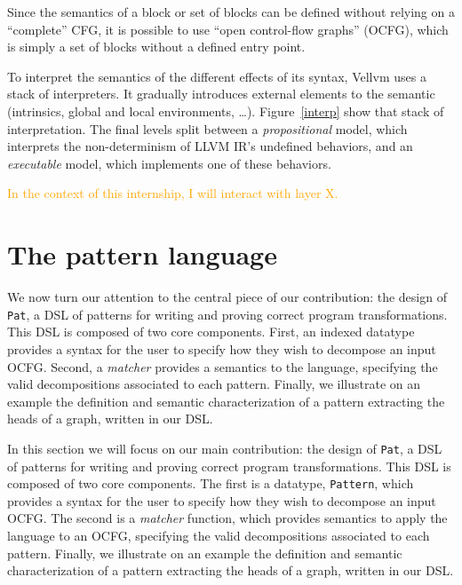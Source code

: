 \documentclass[11pt]{article}
\newcommand{\inlinecoq}[1]{\mbox{\lstinline[style=customcoq,columns=fixed,basewidth=.48em]{#1}}}
\newcommand{\ilc}[1]{\inlinecoq{#1}}
\newcommand{\gr}[1]{\textcolor{Orange}{#1}}
\newcommand{\yz}[1]{\textcolor{ForestGreen}{#1}}
\newcommand{\yzt}[1]{\textcolor{ForestGreen!50}{#1}}
\newcommand{\ocfg}{OCFG\xspace}
\newcommand{\pat}{\texttt{Pat}\xspace}
\begin{document}
Since the semantics of a block or set of blocks can be defined without relying on a ``complete'' CFG, it is possible to use ``open control-flow graphs'' (\ocfg), which is simply a set of blocks without a defined entry point.

To interpret the semantics of the different effects of its syntax, Vellvm uses a stack of interpreters. It gradually introduces external elements to the semantic (intrinsics, global and local environments, \ldots). Figure~\ref{interp} show that stack of interpretation. The final levels split between a \emph{propositional} model, which interprets the non-determinism of LLVM IR's undefined behaviors, and an \emph{executable} model, which implements one of these behaviors.

\gr{In the context of this internship, I will interact with layer X.}

\section{The pattern language}
\label{sec:lang}




\yzt{We now turn our attention to the central piece of our contribution: the design of \pat{}, a DSL of patterns for writing and proving correct program transformations. This DSL is composed of two core components. First, an indexed datatype provides a syntax for the user to specify how they wish to decompose an input \ocfg. Second, a \emph{matcher} provides a semantics to the language, specifying the valid decompositions associated to each pattern. Finally, we illustrate on an example the definition and semantic characterization of a pattern extracting the heads of a graph, written in our DSL.}

In this section we will focus on our main contribution: the design of \pat{}, a DSL of patterns for writing and proving correct program transformations. This DSL is composed of two core components. The first is a datatype, \ilc{Pattern}, which provides a syntax for the user to specify how they wish to decompose an input \ocfg. The second is a \emph{matcher} function, which provides semantics to apply the language to an \ocfg{}, specifying the valid decompositions associated to each pattern. Finally, we illustrate on an example the definition and semantic characterization of a pattern extracting the heads of a graph, written in our DSL\@.
\end{document}
